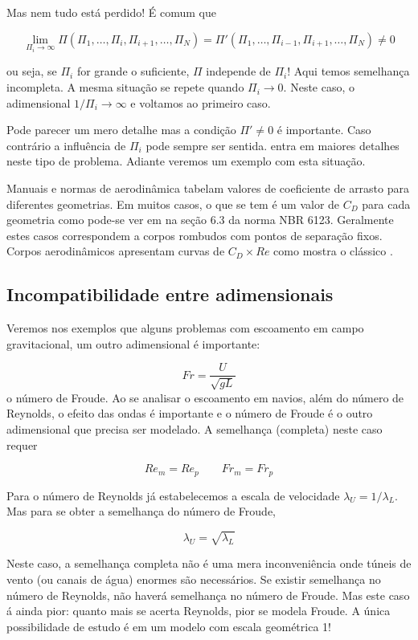 Mas nem tudo está perdido! É comum que

\[
\lim_{\Pi_i\rightarrow\infty} \Pi\left(\Pi_1, \ldots, \Pi_i, \Pi_{i+1}, \ldots, \Pi_N\right) = \Pi'\left(\Pi_1, \ldots, \Pi_{i-1}, \Pi_{i+1}, \ldots, \Pi_N\right) \ne 0
\]

ou seja, se $\Pi_i$ for grande o suficiente, $\Pi$ independe de $\Pi_i$! Aqui temos semelhança incompleta. A mesma situação se repete quando $\Pi_i \longrightarrow 0$. Neste caso, o adimensional $1/\Pi_i \longrightarrow \infty$ e voltamos ao primeiro caso.

Pode parecer um mero detalhe mas a condição $\Pi' \ne 0$ é importante. Caso contrário a influência de $\Pi_i$ pode sempre ser sentida.  entra em maiores detalhes neste tipo de problema. Adiante veremos um exemplo com esta situação.

Manuais e normas de aerodinâmica tabelam valores de coeficiente de arrasto para diferentes geometrias. Em muitos casos, o que se tem é um valor de $C_D$ para cada geometria como pode-se ver em na seção 6.3 da norma NBR 6123\cite{nbr6123}. Geralmente estes casos correspondem a corpos rombudos com pontos de separação fixos. Corpos aerodinâmicos apresentam curvas de $C_D \times Re$ como mostra o clássico .


\subsection{Incompatibilidade entre adimensionais}
Veremos nos exemplos que alguns problemas com escoamento em campo gravitacional, um outro adimensional é importante:

\[
Fr = \frac{U}{\sqrt{gL}}
\]
o número de Froude. Ao se analisar o escoamento em navios, além do número de Reynolds, o efeito das ondas é importante e o número de Froude é o outro adimensional que precisa ser modelado. A semelhança (completa) neste caso requer

\[
Re_m = Re_p \qquad Fr_m = Fr_p
\]

Para o número de Reynolds já estabelecemos a escala de velocidade $\lambda_U = 1/\lambda_L$. Mas para se obter a semelhança do número de Froude,

\[
\lambda_U = \sqrt{\lambda_L}
\]

Neste caso, a semelhança completa não é uma mera inconveniência onde túneis de vento (ou canais de água) enormes são necessários. Se existir semelhança no número de Reynolds, não haverá semelhança no número de Froude. Mas este caso á ainda pior: quanto mais se acerta Reynolds, pior se modela Froude. A única possibilidade de estudo é em um modelo com escala geométrica 1!

